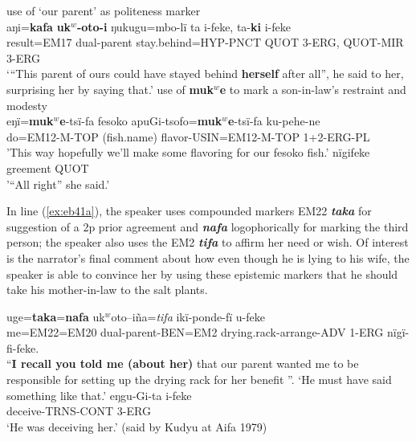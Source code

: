 \documentclass[output=paper]{langsci/langscibook}
\begin{document}
\begin{exe}
\ex \label{ex:eb40}
	\begin{xlist}
	\ex  use of ‘our parent’ as politeness marker \label{ex:eb40a}\\
	\gll aŋi=\textbf{kafa} \textbf{uk$^w$-oto-i} ŋukugu=mbo-lï ta i-feke, ta-\textbf{ki} i-feke\\ %
	result=EM17 dual-parent stay.behind=HYP-PNCT QUOT 3-ERG, QUOT-MIR 3-ERG\\
	\trans ‘“This parent of ours could have stayed behind \textbf{herself} after all”, he said to her, surprising her by saying that.’
	\ex use of \textbf{muk$^w$e} to mark a son-in-law’s restraint and modesty \label{ex:eb40b}\\
	\gll eŋï=\textbf{muk$^w$e}-tsï-fa fesoko apuGi-tsofo=\textbf{muk$^w$e}-tsï-fa ku-pehe-ne\\
	do=EM12-M-TOP (fish.name) flavor-USIN=EM12-M-TOP 1+2-ERG-PL\\
	\trans 'This way hopefully we’ll make some flavoring for our fesoko fish.'
	\ex \label{ex:eb40c}
	 nïgifeke\\
	greement QUOT\\
	\trans '“All right” she said.'
\end{xlist}
\end{exe}

In line (\ref{ex:eb41a}), the speaker uses compounded markers EM22 \textbf{\textit{taka}} for suggestion of a 2p %
prior agreement and \textbf{\textit{nafa}} logophorically for marking the third person;  the speaker also uses the  EM2 \textbf{\textit{tifa}} to affirm her need or wish.  
Of interest is the narrator’s final comment about how even though he is lying to his wife,  the speaker is able to convince her by using these epistemic markers that he should take his mother-in-law to the salt plants. 

\begin{exe}
\ex \label{ex:eb41}
	\begin{xlist}
	\ex \label{ex:eb41a}
	\gll uge=\textbf{taka}=\textbf{nafa} uk$^w$oto–iña=\textit{tifa} ikï-ponde-fï u-feke\\
	me=EM22=EM20 dual-parent-BEN=EM2 drying.rack-arrange-ADV 1-ERG nïgï-fi-feke.\\
	\trans “\textbf{I recall you told me (about her)} that our parent wanted me to be responsible for setting up the drying rack for her benefit ”. ‘He must have said something like that.’
	\ex \label{ex:eb41b}
	\gll eŋgu-Gi-ta i-feke\\
	deceive-TRNS-CONT 3-ERG\\
	\trans ‘He was deceiving her.’ (said by Kudyu at Aifa 1979)
\end{xlist}
\end{exe}
\end{document}
